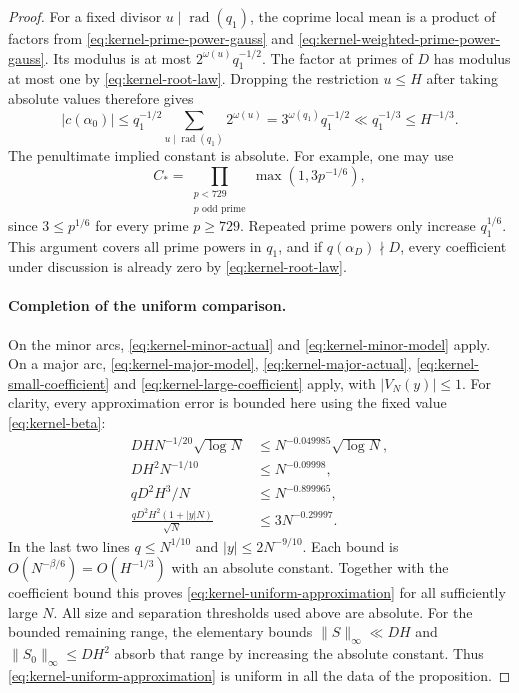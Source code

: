 \begin{proof}
For a fixed divisor $u\mid\operatorname{rad}(q_1)$, the coprime
local mean is a product of factors from
\eqref{eq:kernel-prime-power-gauss} and
\eqref{eq:kernel-weighted-prime-power-gauss}. Its modulus is at most
$2^{\omega(u)}q_1^{-1/2}$.
The factor at primes of $D$ has modulus at most one by
\eqref{eq:kernel-root-law}. Dropping the restriction $u\le H$
after taking absolute values therefore gives
\begin{equation}
 |c(\alpha_0)|
 \le q_1^{-1/2}\sum_{u\mid\operatorname{rad}(q_1)}2^{\omega(u)}
 =3^{\omega(q_1)}q_1^{-1/2}
 \ll q_1^{-1/3}
 \le H^{-1/3}.
 \label{eq:kernel-large-coefficient}
\end{equation}
The penultimate implied constant is absolute. For example, one may use
\[
 C_*=
 \prod_{\substack{p<729\\p\text{ odd prime}}}\max(1,3p^{-1/6}),
\]
since $3\le p^{1/6}$ for every prime $p\ge729$.
Repeated prime powers only increase $q_1^{1/6}$.
This argument covers all prime powers in $q_1$, and if
$q(\alpha_D)\nmid D$, every coefficient under discussion is already
zero by \eqref{eq:kernel-root-law}.

\paragraph{Completion of the uniform comparison.}
On the minor arcs, \eqref{eq:kernel-minor-actual} and
\eqref{eq:kernel-minor-model} apply. On a major arc,
\eqref{eq:kernel-major-model}, \eqref{eq:kernel-major-actual},
\eqref{eq:kernel-small-coefficient} and
\eqref{eq:kernel-large-coefficient} apply, with $|V_N(y)|\le1$.
For clarity, every approximation error is bounded here using the fixed
value \eqref{eq:kernel-beta}:
\begin{align*}
 DHN^{-1/20}\sqrt{\log N}
   &\le N^{-0.049985}\sqrt{\log N},\\
 DH^2N^{-1/10}
   &\le N^{-0.09998},\\
 qD^2H^3/N
   &\le N^{-0.899965},\\
 \frac{qD^2H^2(1+|y|N)}{\sqrt N}
   &\le3N^{-0.29997}.
\end{align*}
In the last two lines $q\le N^{1/10}$ and
$|y|\le2N^{-9/10}$.
Each bound is $O(N^{-\beta/6})=O(H^{-1/3})$ with an absolute constant.
Together with the coefficient bound this proves
\eqref{eq:kernel-uniform-approximation} for all sufficiently large $N$.
All size and separation thresholds used above are absolute.
For the bounded remaining range, the elementary bounds
$\|S\|_\infty\ll DH$ and $\|S_0\|_\infty\le DH^2$
absorb that range by increasing the absolute constant.
Thus \eqref{eq:kernel-uniform-approximation} is uniform in all the
data of the proposition.


\end{proof}
